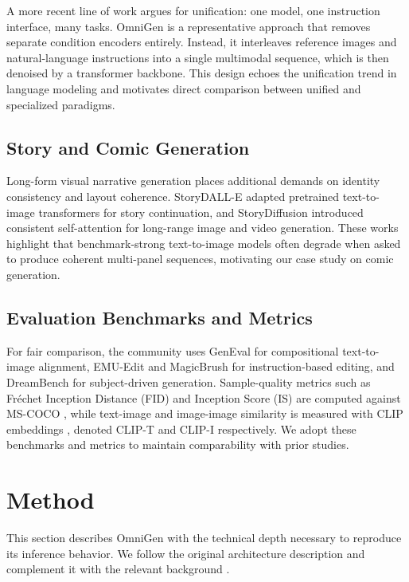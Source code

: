 \documentclass[conference]{IEEEtran}
\begin{document}
A more recent line of work argues for unification: one model, one instruction interface, many tasks. OmniGen \cite{omnigen2024} is a representative approach that removes separate condition encoders entirely. Instead, it interleaves reference images and natural-language instructions into a single multimodal sequence, which is then denoised by a transformer backbone. This design echoes the unification trend in language modeling and motivates direct comparison between unified and specialized paradigms.

\subsection{Story and Comic Generation}
Long-form visual narrative generation places additional demands on identity consistency and layout coherence. StoryDALL-E \cite{maharana2022storydall} adapted pretrained text-to-image transformers for story continuation, and StoryDiffusion \cite{storydiffusion} introduced consistent self-attention for long-range image and video generation. These works highlight that benchmark-strong text-to-image models often degrade when asked to produce coherent multi-panel sequences, motivating our case study on comic generation.

\subsection{Evaluation Benchmarks and Metrics}
For fair comparison, the community uses GenEval \cite{geneval} for compositional text-to-image alignment, EMU-Edit \cite{emuedit} and MagicBrush \cite{magicbrush} for instruction-based editing, and DreamBench \cite{dreambench} for subject-driven generation. Sample-quality metrics such as Fr\'echet Inception Distance (FID) \cite{heusel2017gans} and Inception Score (IS) \cite{salimans2016improved} are computed against MS-COCO \cite{lin2014microsoft}, while text-image and image-image similarity is measured with CLIP embeddings \cite{radford2021learning}, denoted CLIP-T and CLIP-I respectively. We adopt these benchmarks and metrics to maintain comparability with prior studies.

\section{Method}
\label{sec:method}

This section describes OmniGen with the technical depth necessary to reproduce its inference behavior. We follow the original architecture description \cite{omnigen2024} and complement it with the relevant background \cite{liu2022flow,lipman2022flow,sd3,phi3}.
\end{document}
